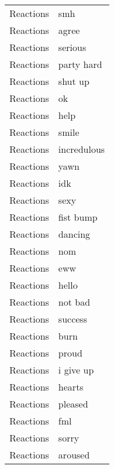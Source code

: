 \begin{supertabular}{l p{0.25\textwidth}}
        Reactions &                                smh \\
        Reactions &                              agree \\
        Reactions &                            serious \\
        Reactions &                         party hard \\
        Reactions &                            shut up \\
        Reactions &                                 ok \\
        Reactions &                               help \\
        Reactions &                              smile \\
        Reactions &                        incredulous \\
        Reactions &                               yawn \\
        Reactions &                                idk \\
        Reactions &                               sexy \\
        Reactions &                          fist bump \\
        Reactions &                            dancing \\
        Reactions &                                nom \\
        Reactions &                                eww \\
        Reactions &                              hello \\
        Reactions &                            not bad \\
        Reactions &                            success \\
        Reactions &                               burn \\
        Reactions &                              proud \\
        Reactions &                          i give up \\
        Reactions &                             hearts \\
        Reactions &                            pleased \\
        Reactions &                                fml \\
        Reactions &                              sorry \\
        Reactions &                            aroused \\

\end{supertabular}
